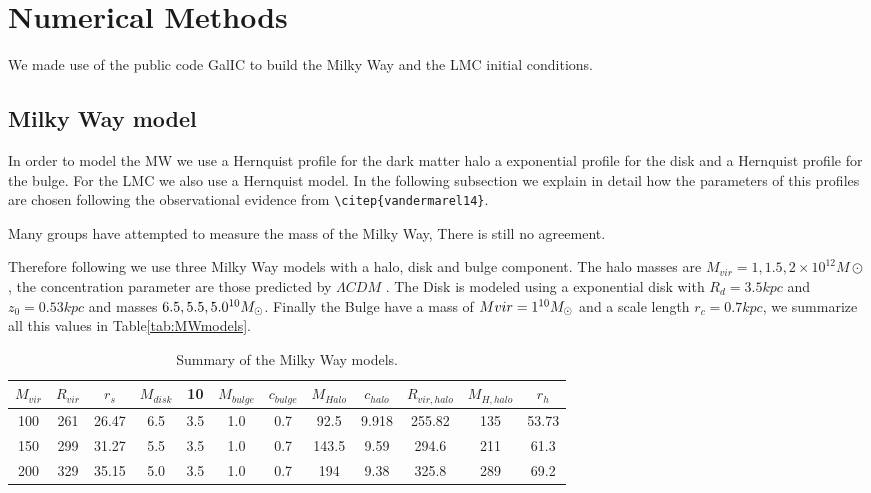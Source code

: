 \section{Numerical Methods}\label{sec:models}
We made use of the public code GalIC to build the Milky Way and the
LMC initial conditions.
\subsection{Milky Way model}


In order to model the MW we use a Hernquist profile for the dark matter halo
a exponential profile for the disk and a Hernquist profile for the bulge. For
the LMC we also use a Hernquist model. In the following subsection we explain
in detail how the parameters of this profiles are chosen following the observational
evidence from \verb+\citep{vandermarel14}+.


Many groups have attempted to measure the mass of the Milky Way,
There is still no agreement.

Therefore following \citep{Gomez15} we use three Milky Way models with
a halo, disk and bulge component. The halo masses are $M_{vir} = 1, 1.5,
2\times 10 ^12 M\odot$, the concentration parameter are those
predicted by $\Lambda CDM$ \citep{Kyplin}. The Disk is modeled using a 
exponential disk with $R_d=3.5kpc$ and $z_0 = 0.53 kpc$ and masses
$6.5, 5.5, 5.0 \time10^{10} M_{\odot}$.
Finally the Bulge have a mass of $Mvir=1\time10^{10}M_{\odot}$ and a
scale length $r_c=0.7 kpc$, we summarize all this values in
Table\ref{tab:MWmodels}.

\begin{table}[H]{\label{tab:MW}}
\begin{center}
\begin{tabular}{c c c c c c c c c c c c}
\hline
\hline
$M_{vir} $ & $R_{vir}$ & $r_s$ & $M_{disk}$ & 10 & $M_{bulge}$ & $c_{bulge} $ & $M_{Halo}$ & $c_{halo}$ & $R_{vir, halo}$ & $M_{H,halo}$ & $r_h $ \\
\hline
100 & 261 & 26.47 & 6.5 & 3.5 & 1.0 & 0.7 & 92.5 & 9.918 &  255.82 & 135 & 53.73 \\
150 & 299 & 31.27 & 5.5 & 3.5 & 1.0 & 0.7 & 143.5 & 9.59 & 294.6 & 211  & 61.3 \\
200 & 329 & 35.15 & 5.0 & 3.5 & 1.0 & 0.7 & 194 & 9.38 & 325.8 & 289 & 69.2 \\
\hline
\end{tabular}
\caption{Summary of the Milky Way models.}
\end{center}
\end{table}

